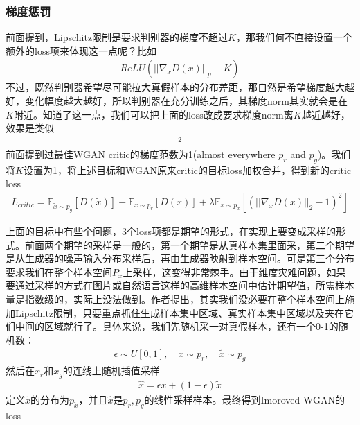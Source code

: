         \subsubsection{梯度惩罚}
            \par
            前面提到，Lipschitz限制是要求判别器的梯度不超过$K$，那我们何不直接设置一个额外的loss项来体现这一点呢？比如
            \begin{align*}
            ReLU(||\nabla_x D(x)||_p-K)
            \end{align*}
            不过，既然判别器希望尽可能拉大真假样本的分布差距，那自然是希望梯度越大越好，变化幅度越大越好，所以判别器在充分训练之后，其梯度norm其实就会是在$K$附近。知道了这一点，我们可以把上面的loss改成要求梯度norm离$K$越近越好，效果是类似
            \begin{align*}
            [||\nabla_x D(x)||_p-K]^2
            \end{align*}
            前面提到过最佳WGAN critic的梯度范数为1(almost everywhere $p_r$ and $p_g$)。我们将$K$设置为1，将上述目标和WGAN原来critic的目标loss加权合并，得到新的critic loss
            \begin{align*}
            L_{critic} = \mathbb{E}_{\tilde{x}\sim p_g}[D(\tilde{x})] - \mathbb{E}_{x\sim p_r}[D(x)] + \lambda \mathbb{E}_{x\sim p_{x}}[(||\nabla_{x}D(x)||_2 - 1)^2]
            \end{align*}
            \par
            上面的目标中有些个问题，3个loss项都是期望的形式，在实现上要变成采样的形式。前面两个期望的采样是一般的，第一个期望是从真样本集里面采，第二个期望是从生成器的噪声输入分布采样后，再由生成器映射到样本空间。可是第三个分布要求我们在整个样本空间$P_x$上采样，这变得非常棘手。由于维度灾难问题，如果要通过采样的方式在图片或自然语言这样的高维样本空间中估计期望值，所需样本量是指数级的，实际上没法做到。作者提出，其实我们没必要在整个样本空间上施加Lipschitz限制，只要重点抓住生成样本集中区域、真实样本集中区域以及夹在它们中间的区域就行了。具体来说，我们先随机采一对真假样本，还有一个0-1的随机数：
            \begin{align*}
            \epsilon \sim U[0,1],\quad x\sim p_r, \quad \tilde{x}\sim p_g
            \end{align*}
            然后在$ x_r $和$ x_g $的连线上随机插值采样
            \begin{align*}
            \hat{x} = \epsilon x+(1-\epsilon)\tilde{x}
            \end{align*}
            定义$\tilde{x}$的分布为$p_{\tilde{x}}$，并且$\hat{x}$是$p_r,p_g$的线性采样样本。最终得到Imoroved WGAN的loss
